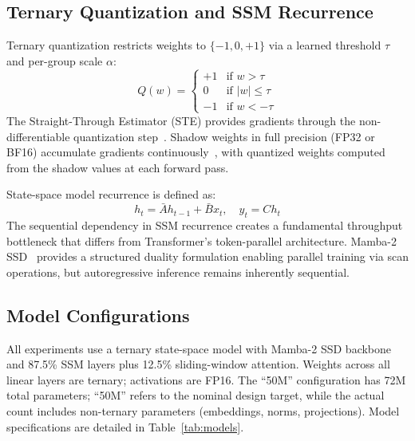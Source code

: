 \documentclass{article}
\begin{document}
\subsection{Ternary Quantization and SSM Recurrence}

Ternary quantization restricts weights to $\{-1, 0, +1\}$ via a learned threshold $\tau$ and per-group scale $\alpha$:
\begin{equation}
Q(w) = \begin{cases}
+1 & \text{if } w > \tau \\
0 & \text{if } |w| \leq \tau \\
-1 & \text{if } w < -\tau
\end{cases}
\end{equation}
The Straight-Through Estimator (STE) provides gradients through the non-differentiable quantization step~\citep{bengio2013estimating, yin2019understanding}. Shadow weights in full precision (FP32 or BF16) accumulate gradients continuously~\citep{courbariaux2015binaryconnect}, with quantized weights computed from the shadow values at each forward pass.

State-space model recurrence is defined as:
\begin{equation}
h_t = \bar{A}h_{t-1} + \bar{B}x_t, \quad y_t = Ch_t
\end{equation}
The sequential dependency in SSM recurrence creates a fundamental throughput bottleneck that differs from Transformer's token-parallel architecture. Mamba-2 SSD~\citep{dao2024transformers} provides a structured duality formulation enabling parallel training via scan operations, but autoregressive inference remains inherently sequential.

\subsection{Model Configurations}

All experiments use a ternary state-space model with Mamba-2 SSD backbone and 87.5\% SSM layers plus 12.5\% sliding-window attention. Weights across all linear layers are ternary; activations are FP16. The ``50M'' configuration has 72M total parameters; ``50M'' refers to the nominal design target, while the actual count includes non-ternary parameters (embeddings, norms, projections). Model specifications are detailed in Table~\ref{tab:models}.
\end{document}
